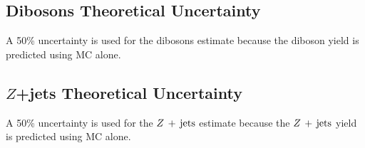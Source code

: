 \subsection{Dibosons Theoretical Uncertainty}

A 50\% uncertainty is used for the dibosons estimate because the diboson yield is predicted using MC alone.

\subsection{$Z$+jets Theoretical Uncertainty}

A 50\% uncertainty is used for the $Z\,+\,\mathrm{jets}$ estimate because the $Z\,+\,\mathrm{jets}$ yield is predicted using MC alone.


